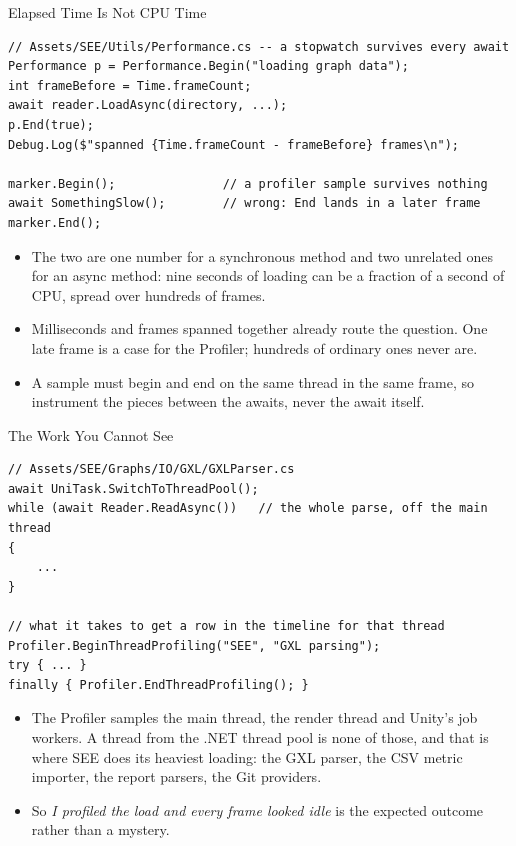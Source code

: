 \begin{frame}[fragile]{Elapsed Time Is Not CPU Time}
  \begin{lstlisting}[basicstyle=\scriptsize\ttfamily]
// Assets/SEE/Utils/Performance.cs -- a stopwatch survives every await
Performance p = Performance.Begin("loading graph data");
int frameBefore = Time.frameCount;
await reader.LoadAsync(directory, ...);
p.End(true);
Debug.Log($"spanned {Time.frameCount - frameBefore} frames\n");

marker.Begin();               // a profiler sample survives nothing
await SomethingSlow();        // wrong: End lands in a later frame
marker.End();
  \end{lstlisting}
  \vspace{0.5ex}

  \begin{itemize}
    \item The two are one number for a synchronous method and two unrelated
      ones for an async method: nine seconds of loading can be a fraction of a
      second of CPU, spread over hundreds of frames.
    \item Milliseconds and frames spanned together already route the question.
      One late frame is a case for the Profiler; hundreds of ordinary ones
      never are.
    \item A sample must begin and end on the same thread in the same frame, so
      instrument the pieces between the awaits, never the await itself.
  \end{itemize}
\end{frame}

\begin{frame}[fragile]{The Work You Cannot See}
  \begin{lstlisting}[basicstyle=\scriptsize\ttfamily]
// Assets/SEE/Graphs/IO/GXL/GXLParser.cs
await UniTask.SwitchToThreadPool();
while (await Reader.ReadAsync())   // the whole parse, off the main thread
{
    ...
}

// what it takes to get a row in the timeline for that thread
Profiler.BeginThreadProfiling("SEE", "GXL parsing");
try { ... }
finally { Profiler.EndThreadProfiling(); }
  \end{lstlisting}
  \vspace{0.5ex}

  \begin{itemize}
    \item The Profiler samples the main thread, the render thread and Unity's
      job workers. A thread from the .NET thread pool is none of those, and
      that is where SEE does its heaviest loading: the GXL parser, the CSV
      metric importer, the report parsers, the Git providers.
    \item So \emph{I profiled the load and every frame looked idle} is the
      expected outcome rather than a mystery.
  \end{itemize}
\end{frame}

